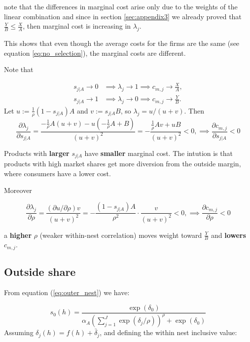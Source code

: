 \documentclass[12pt]{article}
\theoremstyle{plain}
\theoremstyle{plain}
\begin{document}
note that the differences in marginal cost arise only due to the weights of the linear combination and since  in section \ref{sec:appendix3} we already proved that $ \frac{Y}{B} \leq \frac{X}{A}$, then marginal cost is increasing in  $\lambda_j$. 

This shows that even though the average costs for the firms are the same (see equation \ref{eq:no_selection}), the marginal costs are different. 

Note that 

\begin{align*}
s_{j|A} \to 0 &\implies \lambda_j \to 1 \implies c_{m,j} \to \frac{X}{A}, \\
s_{j|A} \to 1 &\implies \lambda_j \to 0 \implies c_{m,j} \to \frac{Y}{B}.
\end{align*}
Let $u := \frac{1}{\rho}(1-s_{j|A})A$ and $v := s_{j|A}B$, so $\lambda_j = u/(u+v)$. Then
\[
\frac{\partial \lambda_j}{\partial s_{j|A}} = \frac{-\frac{1}{\rho}A(u+v) - u(-\frac{1}{\rho}A+B)}{(u+v)^2} = -\frac{\frac{1}{\rho}Av + uB}{(u+v)^2} < 0, \implies  \frac{\partial c_{m,j}}{\partial s_{j|A}} < 0
\]

Products with \textbf{larger} $s_{j|A}$ have \textbf{smaller} marginal cost. The intution is that products with high market shares get more diversion from the outside margin, where consumers have a lower cost. 

Moreover 
 
\[
\frac{\partial \lambda_j}{\partial \rho} = \frac{(\partial u / \partial \rho)v}{(u+v)^2} = -\frac{(1-s_{j|A})A}{\rho^2} \cdot \frac{v}{(u+v)^2} < 0, \implies  \frac{\partial c_{m,j}}{\partial \rho} < 0 
\]


a \textbf{higher} $\rho$ (weaker within-nest correlation) moves weight toward $\frac{Y}{B}$ and \textbf{lowers} $c_{m,j}$.


   
 

\bigskip

\subsection{Outside share}\label{sec:appendix4}

From equation (\ref{eq:outer_nest}) we have: 

\begin{equation}\label{eq:outside_share}
    s_0(h) = \frac{\exp(\delta_0)}{\alpha_A\left(\sum_{j=1}^J \exp(\delta_j/\rho)\right)^\rho +  \exp \left(\delta_0 \right)}
\end{equation}
Assuming  $\delta_j(h) = f(h) + \bar{\delta}_j$, and defining the within nest inclusive value: 
\end{document}
